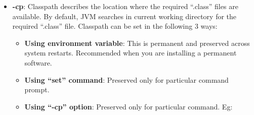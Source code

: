 \begin{flushleft}
\begin{itemize}
\begin{itemize}
			\bigskip
			\item \textbf{-cp}: Classpath describes the location where the required “.class” files are available. By default, JVM searches in current working directory for the required “.class” file. Classpath can be set in the following 3 ways:
			\begin{itemize}
				\item \textbf{Using environment variable}: This is permanent and  preserved across system restarts. Recommended when you are installing a permanent software.
				\item \textbf{Using “set” command}: Preserved only for particular command prompt.
				\bigskip
				\item \textbf{Using “-cp” option}: Preserved only for particular command. Eg:
				\bigskip
				\bigskip
			\end{itemize}				
			
			
		\end{itemize}	
	\end{itemize}
\end{flushleft}

